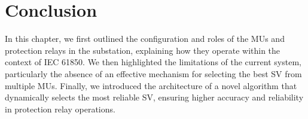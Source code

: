 \section{Conclusion}

In this chapter, we first outlined the configuration and roles of the MUs and protection relays in the substation, explaining how they operate within the context of IEC 61850. We then highlighted the limitations of the current system, particularly the absence of an effective mechanism for selecting the best SV from multiple MUs. Finally, we introduced the architecture of a novel algorithm that dynamically selects the most reliable SV, ensuring higher accuracy and reliability in protection relay operations.

